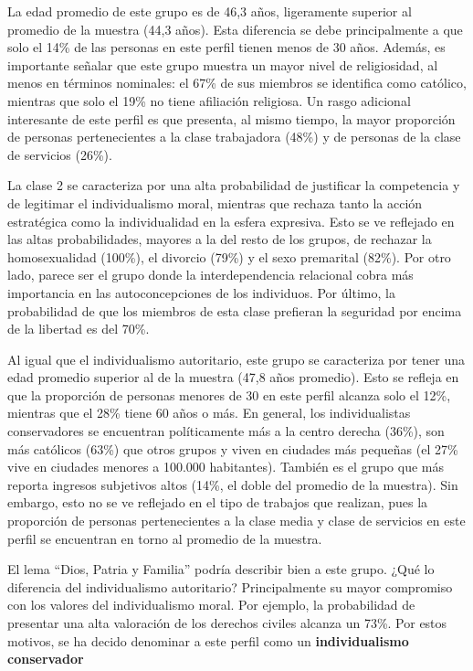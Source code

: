 \documentclass[12pt,twoside]{templates/facsothesis}
\begin{document}
La edad promedio de este grupo es de 46,3 años, ligeramente superior al promedio de la muestra (44,3 años). Esta diferencia se debe principalmente a que solo el 14\% de las personas en este perfil tienen menos de 30 años. Además, es importante señalar que este grupo muestra un mayor nivel de religiosidad, al menos en términos nominales: el 67\% de sus miembros se identifica como católico, mientras que solo el 19\% no tiene afiliación religiosa. Un rasgo adicional interesante de este perfil es que presenta, al mismo tiempo, la mayor proporción de personas pertenecientes a la clase trabajadora (48\%) y de personas de la clase de servicios (26\%).

La clase 2 se caracteriza por una alta probabilidad de justificar la competencia y de legitimar el individualismo moral, mientras que rechaza tanto la acción estratégica como la individualidad en la esfera expresiva. Esto se ve reflejado en las altas probabilidades, mayores a la del resto de los grupos, de rechazar la homosexualidad (100\%), el divorcio (79\%) y el sexo premarital (82\%). Por otro lado, parece ser el grupo donde la interdependencia relacional cobra más importancia en las autoconcepciones de los individuos. Por último, la probabilidad de que los miembros de esta clase prefieran la seguridad por encima de la libertad es del 70\%.

Al igual que el individualismo autoritario, este grupo se caracteriza por tener una edad promedio superior al de la muestra (47,8 años promedio). Esto se refleja en que la proporción de personas menores de 30 en este perfil alcanza solo el 12\%, mientras que el 28\% tiene 60 años o más. En general, los individualistas conservadores se encuentran políticamente más a la centro derecha (36\%), son más católicos (63\%) que otros grupos y viven en ciudades más pequeñas (el 27\% vive en ciudades menores a 100.000 habitantes). También es el grupo que más reporta ingresos subjetivos altos (14\%, el doble del promedio de la muestra). Sin embargo, esto no se ve reflejado en el tipo de trabajos que realizan, pues la proporción de personas pertenecientes a la clase media y clase de servicios en este perfil se encuentran en torno al promedio de la muestra.

El lema ``Dios, Patria y Familia'' podría describir bien a este grupo. ¿Qué lo diferencia del individualismo autoritario? Principalmente su mayor compromiso con los valores del individualismo moral. Por ejemplo, la probabilidad de presentar una alta valoración de los derechos civiles alcanza un 73\%. Por estos motivos, se ha decido denominar a este perfil como un \textbf{individualismo conservador}
\end{document}
